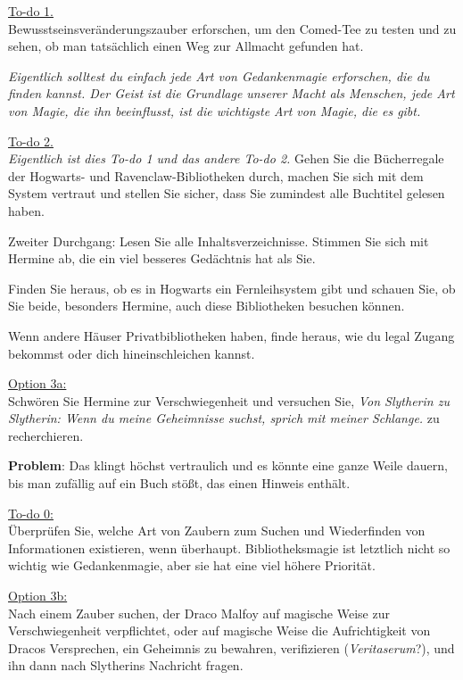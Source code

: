 \underline{To-do 1.}\\
Bewusstseinsveränderungszauber erforschen, um den Comed-Tee zu testen und zu
sehen, ob man tatsächlich einen Weg zur Allmacht gefunden hat.

\emph{Eigentlich solltest du einfach jede Art von Gedankenmagie erforschen, die
du finden kannst. Der Geist ist die Grundlage unserer Macht als Menschen, jede
Art von Magie, die ihn beeinflusst, ist die wichtigste Art von Magie, die es
gibt.}

\underline{To-do 2.}\\
\emph{Eigentlich ist dies To-do 1 und das andere To-do 2.} Gehen Sie die
Bücherregale der Hogwarts- und Ravenclaw-Bibliotheken durch, machen Sie sich mit
dem System vertraut und stellen Sie sicher, dass Sie zumindest alle Buchtitel
gelesen haben.

Zweiter Durchgang: Lesen Sie alle Inhaltsverzeichnisse. Stimmen Sie sich mit
Hermine ab, die ein viel besseres Gedächtnis hat als Sie.

Finden Sie heraus, ob es in Hogwarts ein Fernleihsystem gibt und schauen Sie, ob
Sie beide, besonders Hermine, auch diese Bibliotheken besuchen können.

Wenn andere Häuser Privatbibliotheken haben, finde heraus, wie du legal Zugang
bekommst oder dich hineinschleichen kannst.

\underline{Option 3a:}\\
Schwören Sie Hermine zur Verschwiegenheit und versuchen Sie, \glqq{}\emph{Von
Slytherin zu Slytherin: Wenn du meine Geheimnisse suchst, sprich mit meiner
Schlange.}\grqq{} zu recherchieren.

\textbf{Problem}: Das klingt höchst vertraulich und es könnte eine ganze Weile
dauern, bis man zufällig auf ein Buch stößt, das einen Hinweis enthält.

\underline{To-do 0:}\\
Überprüfen Sie, welche Art von Zaubern zum Suchen und Wiederfinden von
Informationen existieren, wenn überhaupt. Bibliotheksmagie ist letztlich nicht
so wichtig wie Gedankenmagie, aber sie hat eine viel höhere Priorität.

\underline{Option 3b:}\\
Nach einem Zauber suchen, der Draco Malfoy auf magische Weise zur
Verschwiegenheit verpflichtet, oder auf magische Weise die Aufrichtigkeit von
Dracos Versprechen, ein Geheimnis zu bewahren, verifizieren
(\emph{Veritaserum}?), und ihn dann nach Slytherins Nachricht fragen.

